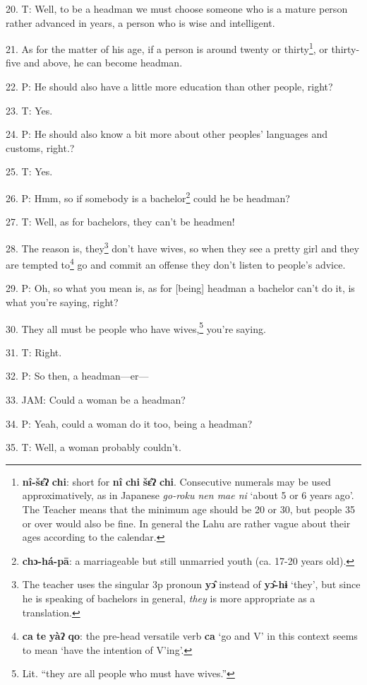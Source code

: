 20. T: Well, to be a headman we must choose someone who is a mature person rather
advanced in years, a person who is wise and intelligent.

21. As for the matter of his age, if a person is around twenty or thirty\footnote{\textbf{nî-šɛ̂ʔ} \textbf{chi}: short for \textbf{nî} \textbf{chi} \textbf{šɛ̂ʔ} \textbf{chi}. Consecutive numerals may be used approximatively, as in Japanese \textit{go-roku nen mae ni} `about 5 or 6 years ago'. The Teacher means that the minimum age should be 20 or 30, but people 35 or over would also be fine. In general the Lahu are rather vague about their ages according to the calendar.}, or
thirty-five and above, he can become headman.

22. P: He should also have a little more education than other people, right?

23. T: Yes.

24. P: He should also know a bit more about other peoples' languages and customs,
right.?

25. T: Yes.

26. P: Hmm, so if somebody is a bachelor\footnote{\textbf{chɔ-há-pā}: a marriageable but still unmarried youth (ca. 17-20 years old).} could he be headman?

27. T: Well, as for bachelors, they can't be headmen!

28. The reason is, they\footnote{The teacher uses the singular 3p pronoun \textbf{yɔ̂} instead of \textbf{yɔ̂-hɨ} `they', but since he is speaking of bachelors in general, \textit{they} is more appropriate as a translation.} don't have wives, so when they see a pretty girl and
they are tempted to\footnote{\textbf{ca} \textbf{te} \textbf{yàʔ} \textbf{qo}: the pre-head versatile verb \textbf{ca} `go and V' in this context seems to mean `have the intention of V'ing'.} go and commit an offense they don't listen to people's advice.

29. P: Oh, so what you mean is, as for [being] headman a bachelor can't do it,
is what you're saying, right?

30. They all must be people who have wives,\footnote{Lit. ``they are all people who must have wives.''} you're saying.

31. T: Right.

32. P: So then, a headman---er---

33. JAM: Could a woman be a headman?

34. P: Yeah, could a woman do it too, being a headman?

35. T: Well, a woman probably couldn't.

